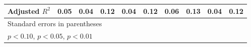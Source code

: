 \begin{table}[htbp]
\begin{tabular}{l*{9}{c}}
Adjusted \(R^{2}\)&     0.05         &     0.04         &     0.12         &     0.04         &     0.12         &     0.06         &     0.13         &     0.04         &     0.12         \\
\hline\hline
\multicolumn{10}{l}{\footnotesize Standard errors in parentheses}\\
\multicolumn{10}{l}{\footnotesize \sym{*} \(p<0.10\), \sym{**} \(p<0.05\), \sym{***} \(p<0.01\)}\\
\end{tabular}
\end{table}

